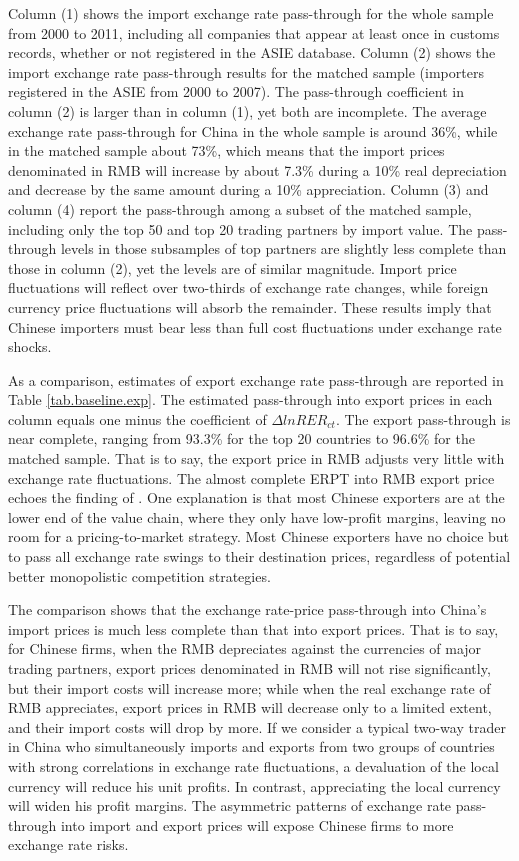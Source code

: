 \documentclass[12pt]{article}
\begin{document}
Column (1) shows the import exchange rate pass-through for the whole sample from 2000 to 2011, including all companies that appear at least once in customs records, whether or not registered in the ASIE database. Column (2) shows the import exchange rate pass-through results for the matched sample (importers registered in the ASIE from 2000 to 2007). The pass-through coefficient in column (2) is larger than in column (1), yet both are incomplete. The average exchange rate pass-through for China in the whole sample is around 36\%, while in the matched sample about 73\%, which means that the import prices denominated in RMB will increase by about 7.3\% during a 10\% real depreciation and decrease by the same amount during a 10\% appreciation. Column (3) and column (4) report the pass-through among a subset of the matched sample, including only the top 50 and top 20 trading partners by import value. The pass-through levels in those subsamples of top partners are slightly less complete than those in column (2), yet the levels are of similar magnitude. Import price fluctuations will reflect over two-thirds of exchange rate changes, while foreign currency price fluctuations will absorb the remainder. These results imply that Chinese importers must bear less than full cost fluctuations under exchange rate shocks. 

As a comparison, estimates of export exchange rate pass-through are reported in Table \ref{tab.baseline.exp}. The estimated pass-through into export prices in each column equals one minus the coefficient of $\Delta lnRER_{ct}$. The export pass-through is near complete, ranging from 93.3\% for the top 20 countries to 96.6\% for the matched sample. That is to say, the export price in RMB adjusts very little with exchange rate fluctuations. The almost complete ERPT into RMB export price echoes the finding of \cite{lmx2015}. One explanation is that most Chinese exporters are at the lower end of the value chain, where they only have low-profit margins, leaving no room for a pricing-to-market strategy. Most Chinese exporters have no choice but to pass all exchange rate swings to their destination prices, regardless of potential better monopolistic competition strategies.

The comparison shows that the exchange rate-price pass-through into China's import prices is much less complete than that into export prices. That is to say, for Chinese firms, when the RMB depreciates against the currencies of major trading partners, export prices denominated in RMB will not rise significantly, but their import costs will increase more; while when the real exchange rate of RMB appreciates, export prices in RMB will decrease only to a limited extent, and their import costs will drop by more. If we consider a typical two-way trader in China who simultaneously imports and exports from two groups of countries with strong correlations in exchange rate fluctuations, a devaluation of the local currency will reduce his unit profits. In contrast, appreciating the local currency will widen his profit margins. The asymmetric patterns of exchange rate pass-through into import and export prices will expose Chinese firms to more exchange rate risks.
\end{document}
